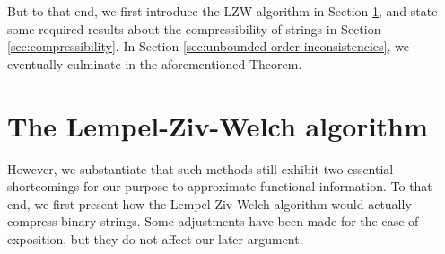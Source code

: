 But to that end, we first introduce the LZW algorithm in Section \ref{sec:limpel-ziv-welch-algorithm}, and state some required results about the compressibility of strings in Section \ref{sec:compressibility}.
In Section \ref{sec:unbounded-order-inconsistencies}, we eventually culminate in the aforementioned Theorem.

\section{The Lempel-Ziv-Welch algorithm}
\label{sec:limpel-ziv-welch-algorithm}
However, we substantiate that such methods still exhibit two essential shortcomings for our purpose to approximate functional information.
To that end, we first present how the Lempel-Ziv-Welch algorithm would actually compress binary strings.
Some adjustments have been made for the ease of exposition, but they do not affect our later argument.
